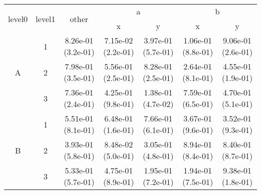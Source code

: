\begin{tabular}{ccccccc}
\toprule
\multirow{2}{*}{level0} & \multirow{2}{*}{level1}& \multirow{2}{*}{other}&\multicolumn{2}{c}{a}&\multicolumn{2}{c}{b}\tabularnewline
\cmidrule(lr){4-5}
\cmidrule(lr){6-7}
&&&x&y&x&y\tabularnewline
\midrule
\multirow{3}{*}{A}&1& 8.26e-01 (3.2e-01)& 7.15e-02 (2.2e-01)& 3.97e-01 (5.7e-01)& 1.06e-01 (8.8e-01)& 9.06e-01 (2.6e-01)\tabularnewline
&2& 7.98e-01 (3.5e-01)& 5.56e-01 (2.5e-01)& 8.28e-01 (2.5e-01)& 2.64e-01 (8.1e-01)& 4.55e-01 (1.9e-01)\tabularnewline
&3& 7.36e-01 (2.4e-01)& 4.25e-01 (9.8e-01)& 1.38e-01 (4.7e-02)& 7.59e-01 (6.5e-01)& 4.70e-01 (5.1e-01)\tabularnewline
\midrule
\multirow{3}{*}{B}&1& 5.51e-01 (8.1e-01)& 6.48e-01 (1.6e-01)& 7.66e-01 (6.1e-01)& 3.67e-01 (9.6e-01)& 3.52e-01 (9.3e-01)\tabularnewline
&2& 3.93e-01 (5.8e-01)& 8.48e-02 (5.0e-01)& 3.05e-01 (4.8e-01)& 8.94e-01 (8.4e-01)& 8.40e-01 (8.7e-01)\tabularnewline
&3& 5.33e-01 (5.7e-01)& 4.75e-01 (8.9e-01)& 1.95e-01 (7.2e-01)& 1.94e-01 (7.5e-01)& 9.38e-01 (1.8e-01)\tabularnewline
\bottomrule
\end{tabular}
